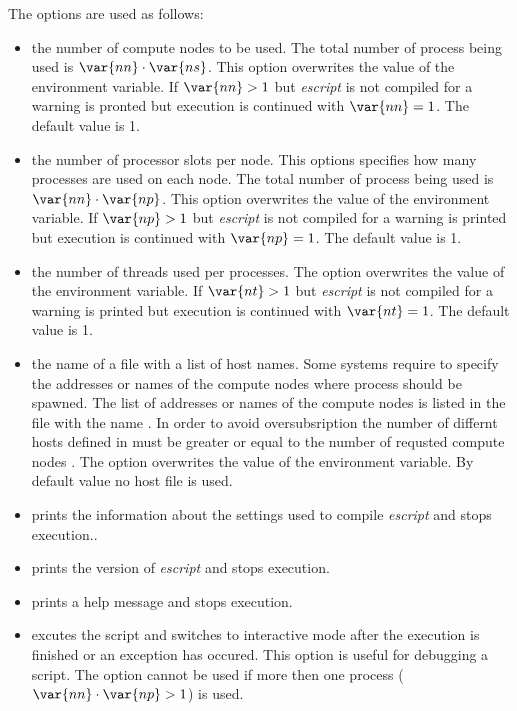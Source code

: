 The options are used as follows:
\begin{itemize}

 \item[\programopt{-n} \var{nn}] the number of compute nodes  to be used. The total number of process being used is 
$\var{nn} \cdot \var{ns}$. This option overwrites the value of the  environment variable. If $\var{nn}>1$ but {\it escript}  is not compiled for \MPI a warning is pronted but execution is continued with $\var{nn}=1$. The default value is 1.
 
\item[\programopt{-p} \var{np}] the number of processor slots per node. This options specifies how many \MPI processes are used on each node. The total number of process being used is 
$\var{nn} \cdot \var{np}$. This option overwrites the value of the  environment variable. If $\var{np}>1$ but {\it escript}  is not compiled for \MPI a warning is printed but execution is continued with $\var{np}=1$. The default value is 1.

 \item[\programopt{-t} \var{nt}] the number of threads used per processes.
The option overwrites the value of the  environment variable.
If $\var{nt}>1$ but {\it escript} is not compiled for \OPENMP a warning is printed but execution is continued with $\var{nt}=1$. The default value is 1.

 \item[\programopt{-f} \var{hostfile}] the name of a file with a list of host names. Some systems require to specify the addresses or names of the compute nodes where \MPI process should be spawned. The list of addresses or names of the compute nodes is listed in the file with the name . In order to avoid oversubsription the number of differnt
hosts defined in  must be greater or equal to the number of requsted compute nodes . The option overwrites the value of the  environment variable. By default value no host file is used.
 \item[\programopt{-c}] prints the information about the settings used to compile {\it escript} and stops execution..
 \item[\programopt{-V}] prints the version of {\it escript} and stops execution.
 \item[\programopt{-h}] prints a help message and stops execution.
 \item[\programopt{-i}] excutes the script  and switches to interactive mode after the execution is finished or an exception has occured. This option is useful for debugging a script. The option cannot be used if more then one process ($\var{nn} \cdot \var{np}>1$) is used.


\end{itemize}
